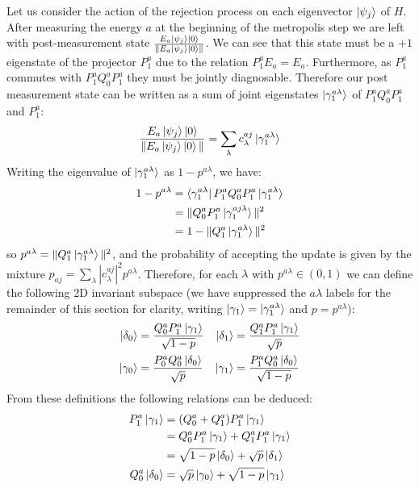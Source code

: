 \documentclass[aps,floatfix,10pt,amssymb,amsfont,amsmath,superscriptaddress,float,nofootinbib,longbibliography,nobalancelastpage,twocolumn]{revtex4-2}
\begin{document}
Let us consider the action of the rejection process on each eigenvector $\ket{\psi_j}$ of $H$. After measuring the energy $a$ at the beginning of the metropolis step we are left with post-measurement state $\frac{E_a\ket{\psi_j}\ket{0}}{\|E_a \ket{\psi_j}\ket{0}\|}$. We can see that this state must be a $+1$ eigenstate of the projector $P^a_1$ due to the relation $P_1^aE_a = E_a$.  Furthermore, as $P_1^a$ commutes with $P^a_1Q^a_0P^a_1$ they must be jointly diagnosable. Therefore our post measurement state can be written as a sum of joint eigenstates $\ket{\gamma_1^{a \lambda}}$ of $P^a_1Q^a_0P^a_1$ and $P_1^a$:
\begin{equation}
    \frac{E_a\ket{\psi_j}\ket{0}}{\|E_a \ket{\psi_j}\ket{0}\|} = \sum_{\lambda} c_{\lambda}^{aj}\ket{\gamma_1^{a \lambda}}
\end{equation}
Writing the eigenvalue of $\ket{\gamma^{a\lambda}_1}$ as $1-p^{a\lambda}$, we have: \begin{align}1-p^{a\lambda}&=\bra{\gamma^{a\lambda}_1}P^a_1Q^a_0P^a_1\ket{\gamma^{a\lambda}_1} \\&=\|Q^a_0P^a_1\ket{\gamma^{aj\lambda}_1}\|^2\\ &= 1-\|Q^a_1\ket{\gamma^{a\lambda}_1}\|^2
\end{align}
so $p^{a\lambda} = \|Q^a_1\ket{\gamma^{a\lambda}_1}\|^2$, and the probability of accepting the update is given by the mixture $p_{aj} = \sum_{\lambda}|c^{aj}_{\lambda}|^2p^{a\lambda}$. Therefore, for each $\lambda$ with $p^{a\lambda} \in (0,1)$ we can define the following 2D invariant subspace (we have suppressed the $a\lambda$ labels for the remainder of this section for clarity, writing $\ket{\gamma_1} = \ket{\gamma^{a\lambda}_1}$ and $p = p^{a\lambda}$):
\begin{align}
    \ket{\delta_0} &= \frac{Q^a_0P^a_1\ket{\gamma_1}}{\sqrt{1-p}} &\ket{\delta_1} &= \frac{Q^a_1P^a_1\ket{\gamma_1}}{\sqrt{p}} \\
    \ket{\gamma_0} &= \frac{P^a_0Q^a_0\ket{\delta_0}}{\sqrt{p}} &\ket{\gamma_1} &= \frac{P^a_1Q^a_0\ket{\delta_0}}{\sqrt{1-p}}
\end{align}
From these definitions the following relations can be deduced:
\begin{align}
\begin{split}
\label{eq:deltagamma0}
    P^a_1 \ket{\gamma_1} &= (Q^a_0+Q^a_1)P^a_1 \ket{\gamma_1}\\
    &= Q^a_0P^a_1 \ket{\gamma_1}+Q^a_1P^a_1 \ket{\gamma_1}\\
    &= \sqrt{1-p} \ket{\delta_0} + \sqrt{p}\ket{\delta_1}\\
    Q^a_0\ket{\delta_0} &= \sqrt{p} \ket{\gamma_0} + \sqrt{1-p} \ket{\gamma_1}
\end{split}
\end{align}
\end{document}
